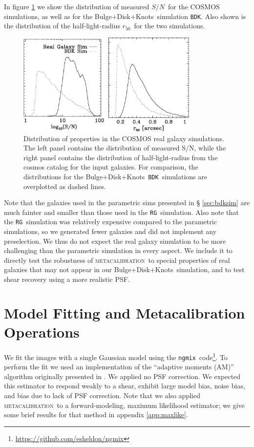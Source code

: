 \documentclass[iop, twocolappendix, appendixfloats, numberedappendix, apj]{emulateapj}
\newcommand{\snr}{$S/N$}
\newcommand{\hlr}{$r_{50}$}
\newcommand{\mcal}{\textsc{metacalibration}}
\newcommand{\ngmix}{\texttt{ngmix}}
\newcommand{\bdkfull}{Bulge+Disk+Knots}
\newcommand{\bdksim}{\texttt{BDK}}
\newcommand{\rgsim}{\texttt{RG}}
\begin{document}
In figure \ref{fig:cosmos} we show the distribution of measured \snr\ for the
COSMOS simulations, as well as for the \bdkfull\ simulation
\bdksim.  Also shown is the distribution of the half-light-radius \hlr\
for the two simulations.

\begin{figure}
    \centering
    \includegraphics[width=0.8\textwidth]{mcal-v14s01-s2n-and-r50-with-nsim.eps}

		\caption{Distribution of properties in the COSMOS real galaxy simulations. The
		left panel contains the distribution of measured S/N, while the right panel contains
		the distribution of half-light-radius from the cosmos catalog for the input
		galaxies.  For comparison, the distributions for the \bdkfull\ \bdksim\ simulations
		are overplotted as dashed lines.}
\label{fig:cosmos}
\end{figure}


Note that the galaxies used in the parametric sims presented in \S
\ref{sec:bdksim} are much fainter and smaller than those used in the \rgsim\
simulation.  Also note that the \rgsim\ simulation was relatively expensive
compared to the parametric simulations, so we generated fewer galaxies and did
not implement any preselection.  We thus do not expect the real galaxy
simulation to be more challenging than the parametric simulation in every
aspect. We include it to directly test the robustness of \mcal\ to special
properties of real galaxies that may not appear in our \bdkfull\ simulation,
and to test shear recovery using a more realistic PSF.  

\section{Model Fitting and Metacalibration Operations} \label{sec:modelfit}

We fit the images with a single Gaussian model using the \ngmix\
code\footnote{\url{https://github.com/esheldon/ngmix}}.  To perform the fit we
used an implementation of the ``adaptive moments (AM)'' algorithm originally
presented in \cite{bj02}.   We applied no PSF correction.  We expected this
estimator to respond weakly to a shear, exhibit large model bias, noise bias,
and bias due to lack of PSF correction.  Note that we also applied \mcal\ to a
forward-modeling, maximum likelihood estimator; we give some brief results for
that method in appendix \ref{app:maxlike}.
\end{document}
